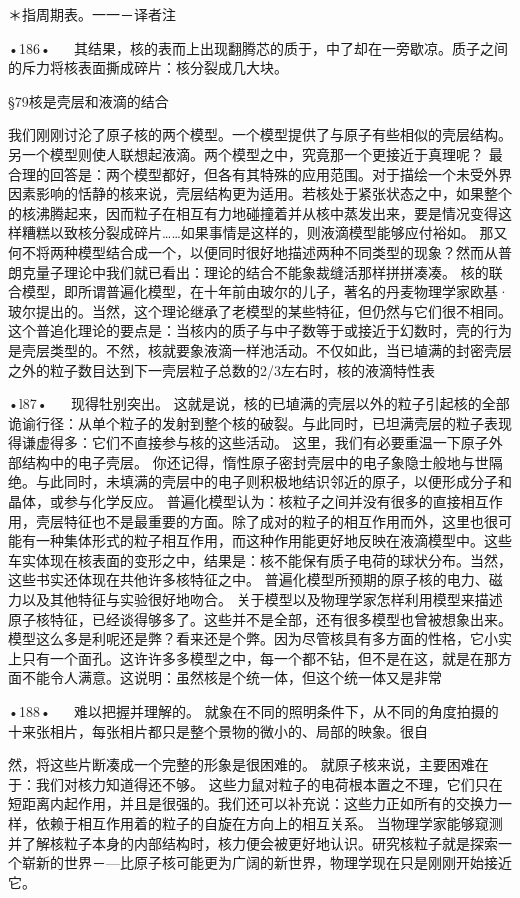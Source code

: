 ＊指周期表。一一－译者注

•186•
  
其结果，核的表而上出现翻腾芯的质于，中了却在一旁歇凉。质子之间的斥力将核表面撕成碎片：核分裂成几大块。

§79核是壳层和液滴的结合

我们刚刚讨沦了原子核的两个模型。一个模型提供了与原子有些相似的壳层结构。另一个模型则使人联想起液滴。两个模型之中，究竟那一个更接近于真理呢？
最合理的回答是：两个模型都好，但各有其特殊的应用范围。对于描绘一个未受外界因素影响的恬静的核来说，壳层结构更为适用。若核处于紧张状态之中，如果整个的核沸腾起来，因而粒子在相互有力地碰撞着并从核中蒸发出来，要是情况变得这样糟糕以致核分裂成碎片……如果事情是这样的，则液滴模型能够应付裕如。
那又何不将两种模型结合成一个，以便同时很好地描述两种不同类型的现象？然而从普朗克量子理论中我们就已看出：理论的结合不能象裁缝活那样拼拼凑凑。
核的联合模型，即所谓普遍化模型，在十年前由玻尔的儿子，著名的丹麦物理学家欧基·玻尔提出的。当然，这个理论继承了老模型的某些特征，但仍然与它们很不相同。
这个普追化理论的要点是：当核内的质子与中子数等于或接近于幻数时，壳的行为是壳层类型的。不然，核就要象液滴一样池活动。不仅如此，当已埴满的封密壳层之外的粒子数目达到下一壳层粒子总数的2/3左右时，核的液滴特性表

•l87•
  
现得牡别突出。
这就是说，核的已埴满的壳层以外的粒子引起核的全部诡谕行径：从单个粒子的发射到整个核的破裂。与此同时，已坦满壳层的粒子表现得谦虚得多：它们不直接参与核的这些活动。
这里，我们有必要重温一下原子外部结构中的电子壳层。
你还记得，惰性原子密封壳层中的电子象隐士般地与世隔绝。与此同时，未填满的壳层中的电子则积极地结识邻近的原子，以便形成分子和晶体，或参与化学反应。
普遍化模型认为：核粒子之间并没有很多的直接相互作用，壳层特征也不是最重要的方面。除了成对的粒子的相互作用而外，这里也很可能有一种集体形式的粒子相互作用，而这种作用能更好地反映在液滴模型中。这些车实体现在核表面的变形之中，结果是：核不能保有质子电荷的球状分布。当然，这些书实还体现在共他许多核特征之中。
普遍化模型所预期的原子核的电力、磁力以及其他特征与实验很好地吻合。
关于模型以及物理学家怎样利用模型来描述原子核特征，已经谈得够多了。这些并不是全部，还有很多模型也曾被想象出来。
模型这么多是利呢还是弊？看来还是个弊。因为尽管核具有多方面的性格，它小实上只有一个面孔。这许许多多模型之中，每一个都不钻，但不是在这，就是在那方面不能令人满意。这说明：虽然核是个统一体，但这个统一体又是非常

•188•
  
难以把握并理解的。
就象在不同的照明条件下，从不同的角度拍摄的十来张相片，每张相片都只是整个景物的微小的、局部的映象。很自

然，将这些片断凑成一个完整的形象是很困难的。
就原子核来说，主要困难在于：我们对核力知道得还不够。
这些力鼠对粒子的电荷根本置之不理，它们只在短距离内起作用，并且是很强的。我们还可以补充说：这些力正如所有的交换力一样，依赖于相互作用着的粒子的自旋在方向上的相互关系。
当物理学家能够窥测并了解核粒子本身的内部结构时，核力便会被更好地认识。研究核粒子就是探索一个崭新的世界－—比原子核可能更为广阔的新世界，物理学现在只是刚刚开始接近它。

